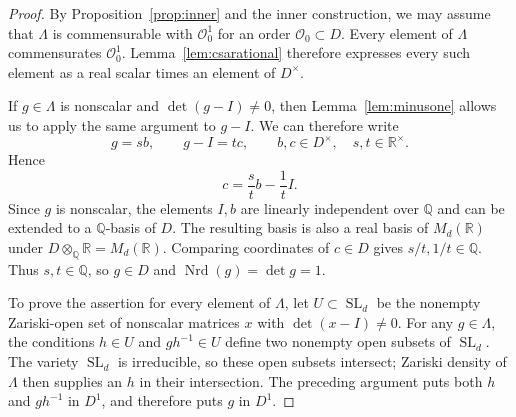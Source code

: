\documentclass[reqno]{amsart}
\theoremstyle{remark}
\DeclareMathOperator{\Nrd}{Nrd}
\DeclareMathOperator{\SL}{SL}
\newcommand{\R}{\mathbb R}
\newcommand{\Q}{\mathbb Q}
\newcommand{\OO}{\mathcal O}
\begin{document}
\begin{proof}
By Proposition~\ref{prop:inner} and the inner construction, we may assume that $\Lambda$ is commensurable with $\OO_0^1$ for an order $\OO_0\subset D$. Every element of $\Lambda$ commensurates $\OO_0^1$. Lemma~\ref{lem:csarational} therefore expresses every such element as a real scalar times an element of $D^\times$.

If $g\in\Lambda$ is nonscalar and $\det(g-I)\ne0$, then Lemma~\ref{lem:minusone} allows us to apply the same argument to $g-I$. We can therefore write
$$
g=sb,\qquad g-I=tc,
\qquad b,c\in D^\times,\quad s,t\in\R^\times.
$$
Hence
$$
c=\frac{s}{t}b-\frac1tI.
$$
Since $g$ is nonscalar, the elements $I,b$ are linearly independent over $\Q$ and can be extended to a $\Q$-basis of $D$. The resulting basis is also a real basis of $M_d(\R)$ under $D\otimes_\Q\R=M_d(\R)$. Comparing coordinates of $c\in D$ gives $s/t,1/t\in\Q$. Thus $s,t\in\Q$, so $g\in D$ and $\Nrd(g)=\det g=1$.

To prove the assertion for every element of $\Lambda$, let $U\subset\SL_d$ be the nonempty Zariski-open set of nonscalar matrices $x$ with $\det(x-I)\ne0$. For any $g\in\Lambda$, the conditions $h\in U$ and $gh^{-1}\in U$ define two nonempty open subsets of $\SL_d$. The variety $\SL_d$ is irreducible, so these open subsets intersect; Zariski density of $\Lambda$ then supplies an $h$ in their intersection. The preceding argument puts both $h$ and $gh^{-1}$ in $D^1$, and therefore puts $g$ in $D^1$.
\end{proof}
\end{document}
